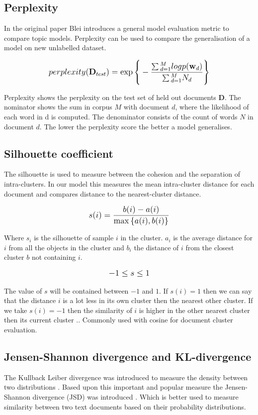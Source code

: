 \subsection{Perplexity}\label{methodology:perplexity}
In the original paper Blei introduces a general model evaluation metric \cite{Blei2003} to compare topic models. Perplexity can be used to compare the generalisation of a model on new unlabelled dataset.

\[
   \mathlarger{perplexity(\textbf{D}_{test}) = \exp{\Bigg \{ -\frac{\sum{}_{d=1}^{M}logp(\textbf{w}_d)}{\sum{}_{d=1}^{M}N_d} \Bigg \}}}
\]

Perplexity shows the perplexity on the test set of held out documents $\textbf{D}$. The nominator shows the sum in  corpus $M$ with document $d$, where the likelihood of each word in d is computed. The denominator consists of the count of words $N$ in document $d$. The lower the perplexity score the better a model generalises.

\subsection{Silhouette coefficient} \label{methodology:silhouette}
The silhouette is used to measure between the cohesion and the separation of intra-clusters. In our model this measures the mean intra-cluster distance for each document and compares distance to the nearest-cluster distance.

\[
   \mathlarger{s(i) = \frac{b(i) - a(i)}{\max{\{ a(i), b(i)}\} } }
\]

Where $s_i$ is the silhouette of sample $i$ in the cluster. $a_i$ is the average distance for $i$ from all the objects in the cluster and $b_i$ the distance of $i$ from the closest cluster $b$ not containing $i$. 

\[
\mathlarger{-1 \leq s \le 1}
\]

The value of $s$ will be contained between $-1$ and $1$. If $s(i) = 1$ then we can say that the distance $i$  is a lot less in its own cluster then the nearest other cluster. If we take $s(i) = -1$ then the similarity of $i$ is higher in the other nearest cluster then its current cluster \cite{Rousseeuw1987Silhouettes:Analysis}.. Commonly used with cosine for document cluster evaluation.


\subsection{Jensen-Shannon divergence and KL-divergence} \label{methodology:jsdivergence}
The Kullback Leiber divergence was introduced to measure the density between two distributions \cite{Hershey2007ApproximatingModels}. Based upon this important and popular measure the Jensen-Shannon divergence (JSD) was introduced \cite{Fuglede2004Jensen-ShannonEmbedding}. Which is better used to measure similarity between two text documents based on their probability distributions.


